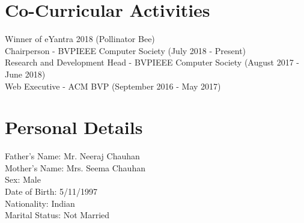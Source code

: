 \documentclass{article}
\begin{document}
\section{Co-Curricular Activities}
Winner of eYantra 2018 (Pollinator Bee)
\\Chairperson - BVPIEEE Computer Society (July 2018 - Present)
\\Research and Development Head - BVPIEEE Computer Society (August 2017 - June 2018)
\\Web Executive - ACM BVP (September 2016 - May 2017)

\section{Personal Details}
Father's Name: Mr. Neeraj Chauhan
\\ Mother's Name: Mrs. Seema Chauhan
\\ Sex: Male
\\ Date of Birth: 5/11/1997
\\ Nationality: Indian
\\ Marital Status: Not Married
\end{document}
